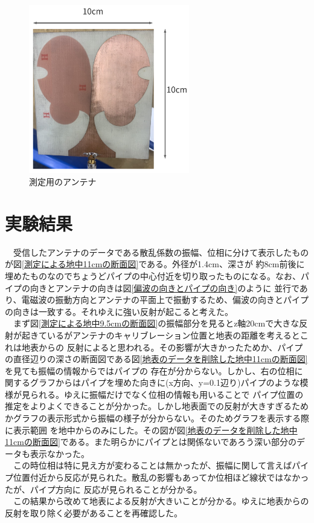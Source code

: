 \documentclass[a4paper,12pt]{jsreport}
\begin{document}
  \begin{figure}[h]
    \begin{center}
     \includegraphics[width=7cm]{./image/antenna.pdf}
    \caption{測定用のアンテナ  }\label{測定用のアンテナ}
    \end{center}
    \end{figure}

\section{実験結果}
　受信したアンテナのデータである散乱係数の振幅、位相に分けて表示したものが図\ref{測定による地中11cmの断面図}である。外径が1.4cm、深さが
約8cm前後に埋めたものなのでちょうどパイプの中心付近を切り取ったものになる。なお、パイプの向きとアンテナの向きは図\ref{偏波の向きとパイプの向き}のように
並行であり、電磁波の振動方向とアンテナの平面上で振動するため、偏波の向きとパイプの向きは一致する。それゆえに強い反射が起こると考えた。
\\　まず図\ref{測定による地中9.5cmの断面図}の振幅部分を見るとz軸20cmで大きな反射が起きているがアンテナのキャリブレーション位置と地表の距離を考えるとこれは地表からの
反射によると思われる。その影響が大きかったためか、パイプの直径辺りの深さの断面図である図\ref{地表のデータを削除した地中11cmの断面図}を見ても振幅の情報からではパイプの
存在が分からない。しかし、右の位相に関するグラフからはパイプを埋めた向きに(x方向、y=0.1辺り)パイプのような模様が見られる。ゆえに振幅だけでなく位相の情報も用いることで
パイプ位置の推定をよりよくできることが分かった。しかし地表面での反射が大きすぎるためかグラフの表示形式から振幅の様子が分からない。そのためグラフを表示する際に表示範囲
を地中からのみにした。その図が図\ref{地表のデータを削除した地中11cmの断面図}である。また明らかにパイプとは関係ないであろう深い部分のデータも表示なかった。
\\　この時位相は特に見え方が変わることは無かったが、振幅に関して言えばパイプ位置付近から反応が見られた。散乱の影響もあってか位相ほど線状ではなかったが、パイプ方向に
反応が見られることが分かる。
\\　この結果から改めて地表による反射が大きいことが分かる。ゆえに地表からの反射を取り除く必要があることを再確認した。
\end{document}
